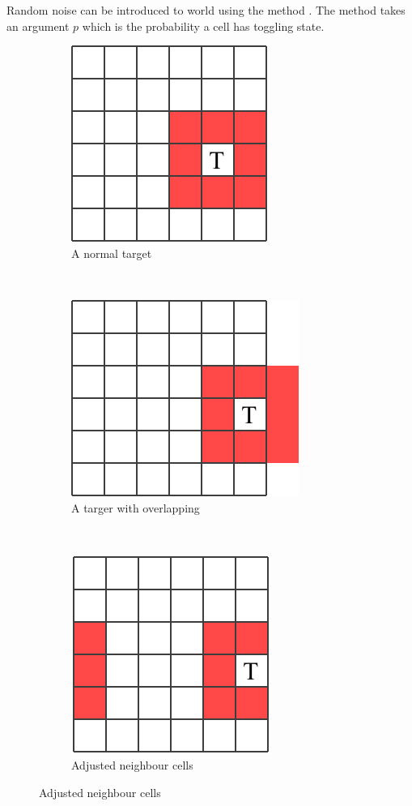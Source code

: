 Random noise can be introduced to world using the method .
The method takes an argument $p$ which is the probability a cell has toggling
state. 
\begin{figure}
        \centering
        \begin{subfigure}[b]{0.3\textwidth}
				\includegraphics{Normal-target}
                \caption*{A normal target}
        \end{subfigure}%
        ~
        \begin{subfigure}[b]{0.3\textwidth}
				\includegraphics{Off-target}
                \caption*{A targer with overlapping}
        \end{subfigure}
         ~
        \begin{subfigure}[b]{0.3\textwidth}
				\includegraphics{Off-target-adjusted}
                \caption*{Adjusted neighbour cells}
        \end{subfigure}
\end{figure}

